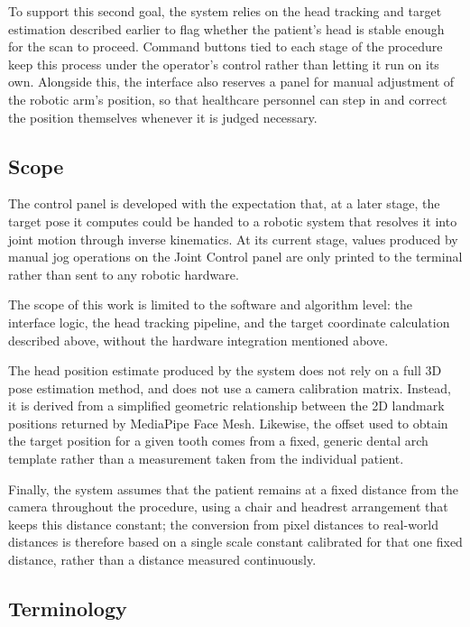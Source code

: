 To support this second goal, the system relies on the head tracking and target estimation described earlier to flag whether the patient's head is stable enough for the scan to proceed. Command buttons tied to each stage of the procedure keep this process under the operator's control rather than letting it run on its own. Alongside this, the interface also reserves a panel for manual adjustment of the robotic arm's position, so that healthcare personnel can step in and correct the position themselves whenever it is judged necessary.
\subsection{Scope}
\label{sec:scope}

The control panel is developed with the expectation that, at a later stage, the target pose it computes could be handed to a robotic system that resolves it into joint motion through inverse kinematics.
At its current stage, values produced by manual jog operations on the Joint Control panel are only printed to the terminal rather than sent to any robotic hardware.

The scope of this work is limited to the software and algorithm level: the interface logic, the head tracking pipeline, and the target coordinate calculation described above, without the hardware integration mentioned above.

The head position estimate produced by the system does not rely on a full 3D pose estimation method, and does not use a camera calibration matrix. Instead, it is derived from a simplified geometric relationship between the 2D landmark positions returned by MediaPipe Face Mesh. Likewise, the offset used to obtain the target position for a given tooth comes from a fixed, generic dental arch template rather than a measurement taken from the individual patient. 

Finally, the system assumes that the patient remains at a fixed distance from the camera throughout the procedure, using a chair and headrest arrangement that keeps this distance constant; the conversion from pixel distances to real-world distances is therefore based on a single scale constant calibrated for that one fixed distance, rather than a distance measured continuously.

\subsection{Terminology}
\label{sec:terminology}

